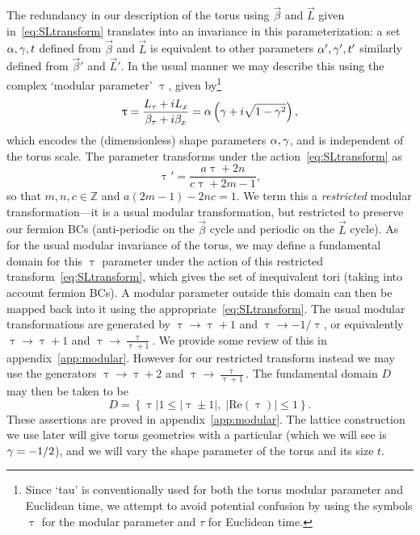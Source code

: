 The redundancy in our description of the torus using $\vec{\beta}$ and $\vec{L}$ given in~\eqref{eq:SLtransform} translates into an invariance in this parameterization: a set $\alpha, \gamma, t$ defined from $\vec{\beta}$ and $\vec{L}$ is equivalent to other parameters $\alpha', \gamma', t'$ similarly defined from $\vec{\beta}'$ and $\vec{L}'$.
In the usual manner we may describe this using the complex `modular parameter' $\uptau$, given by\footnote{Since `tau' is conventionally used for both the torus modular parameter and Euclidean time, we attempt to avoid potential confusion by using the symbols $\uptau$ for the modular parameter and $\tau$ for Euclidean time.}
\begin{equation}
  \uptau = \frac{L_{\tau} + iL_x}{\beta_{\tau} + i\beta_x} = \alpha \left(\gamma + i\sqrt{1 - \gamma^2}\right),
\end{equation}
which encodes the (dimensionless) shape parameters $\alpha, \gamma$, and is independent of the torus scale.
The parameter transforms under the action~\eqref{eq:SLtransform} as
\begin{equation}
  \uptau' = \frac{a \uptau + 2n}{c \uptau + 2m - 1},
\end{equation}
so that $m, n, c \in \mathbb{Z}$ and $a(2m - 1) - 2nc = 1$.
We term this a \emph{restricted} modular transformation---it is a usual modular transformation, but restricted to preserve our fermion BCs (anti-periodic on the $\vec{\beta}$ cycle and periodic on the $\vec{L}$ cycle).
As for the usual modular invariance of the torus, we may define a fundamental domain for this $\uptau$ parameter under the action of this restricted transform~\eqref{eq:SLtransform}, which gives the set of inequivalent tori (taking into account fermion BCs).
A modular parameter outside this domain can then be mapped back into it using the appropriate~\eqref{eq:SLtransform}.
The usual modular transformations are generated by $\uptau \to \uptau + 1$ and $\uptau \to -1 / \uptau$, or equivalently $\uptau \to \uptau + 1$ and $\uptau \to \frac{\uptau}{\uptau + 1}$.
We provide some review of this in appendix~\ref{app:modular}.
However for our restricted transform instead we may use the generators $\uptau \to \uptau + 2$ and $\uptau \to \frac{\uptau}{\uptau + 1}$.
The fundamental domain $D$ may then be taken to be
\begin{equation}
  D = \left\{\uptau\big|1 \le |\uptau \pm 1|, \; |\mathrm{Re}(\uptau)| \le 1\right\}.
\end{equation}
These assertions are proved in appendix~\ref{app:modular}.
The lattice construction we use later will give torus geometries with a particular \ga (which we will see is $\gamma = -1 / 2$), and we will vary the shape parameter \al of the torus and its size $t$.
